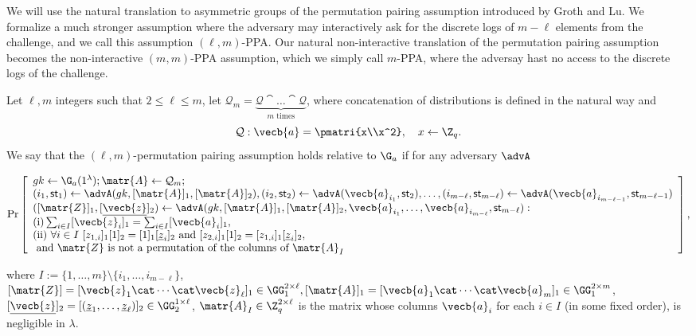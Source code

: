 
We will use the natural translation to asymmetric groups of the permutation pairing assumption introduced by Groth and Lu. We formalize a much stronger assumption where the adversary may interactively ask for the discrete logs of $m-\ell$ elements from the challenge, and we call this assumption $(\ell,m)$-PPA.
Our natural non-interactive translation of the permutation pairing assumption becomes the non-interactive $(m,m)$-PPA assumption, which we simply call $m$-PPA, where the adversay hast no access to the discrete logs of the challenge.
\begin{definition}\label{def:ppa}
Let $\ell,m$ integers such that $2\leq \ell \leq m$, let $\mathcal{Q}_{m}=\underbrace{\mathcal{Q}\cat\ldots\cat\mathcal{Q}}_{m\text{ times}}$, where concatenation of  distributions is defined in the natural way and 
$$\mathcal{Q}: \vecb{a}=\pmatri{x\\x^2},\quad x\gets\Z_q.$$
We say that the $(\ell,m)$-permutation pairing assumption holds relative to $\G_a$ if for any adversary $\advA$
\begin{small}$$
\Pr\left[
\begin{array}{l}
	gk\gets\G_a(1^\lambda);\matr{A}\gets\mathcal{Q}_{m};\\
	(i_1,\mathsf{st}_1) \gets \advA(gk,[\matr{A}]_1,[\matr{A}]_2),
	(i_2,\mathsf{st}_2) \gets \advA(\vecb{a}_{i_1},\mathsf{st}_2),
	\ldots,
	(i_{m-\ell},\mathsf{st}_{m-\ell}) \gets \advA(\vecb{a}_{i_{m-\ell-1}},\mathsf{st}_{m-\ell-1})\\
	([\matr{Z}]_1,[\underline{\vecb{z}}]_2)\gets\advA(gk,[\matr{A}]_1,[\matr{A}]_2, \vecb{a}_{i_1},\ldots, \vecb{a}_{i_{m-\ell}},\mathsf{st}_{m-\ell}):\\
	\mathrm{(i)} \sum_{i\in I}[\vecb{z}_i]_1 = \sum_{i\in I}[\vecb{a}_i]_1,\\
	\mathrm{(ii)}\ \forall i\in I \ [z_{1,i}]_1[1]_2=[1]_1[\underline{z}_{i}]_2 \text{ and } [z_{2,i}]_1[1]_2=[z_{1,i}]_1[\underline{z}_{i}]_2,\\
	\text{ and }\matr{Z}\text{ is not a permutation of the columns of }\matr{A}_I
\end{array}
\right],
$$\end{small}
where $I:=\{1,\ldots, m\}\setminus \{i_1,\ldots, i_{m-\ell} \}$, $[\matr{Z}]=[\vecb{z}_1\cat\cdots\cat\vecb{z}_\ell]_1\in\GG_1^{2\times \ell}, [\matr{A}]_1=[\vecb{a}_1\cat\cdots\cat\vecb{a}_m]_1\in\GG_1^{2\times m}$, $[\underline{\vecb{z}}]_2=\allowbreak[(\underline{z}_1,\ldots,\allowbreak \underline{z}_\ell)]_2\in\GG_2^{1\times \ell}$,
$\matr{A}_I\in \Z_q^{2\times \ell}$ is the matrix whose columns $\vecb{a}_i$ for each $i\in I$ (in some fixed order),
 is negligible in $\lambda$.
\end{definition}

